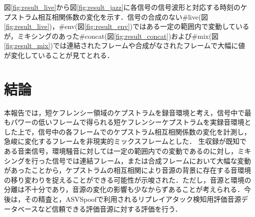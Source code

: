 \documentclass[technicalreport]{ieicej}
\begin{document}
図\ref{fig:result_live}から図\ref{fig:result_jazz}に各信号の信号波形と対応する時刻のケプストラム相互相関係数の変化を示す．信号の合成のない\#live(図\ref{fig:result_live})，\#env(図\ref{fig:result_env})ではある一定の範囲内で変動しているが，ミキシングのあった\#concat(図\ref{fig:result_concat})および\#mix(図\ref{fig:result_mix})では連結されたフレームや合成がなされたフレームで大幅に値が変化していることが見てとれる．




\section{結論}
本報告では，短ケフレンシー領域のケプストラムを録音環境と考え，信号中で最もパワーの低いフレームで得られる短ケフレンシーケプストラムを実録音環境とした上で，信号中の各フレームでのケプストラム相互相関係数の変化を計測し，急峻に変化するフレームを非現実的ミックスフレームとした．
生収録が既知である音楽信号，環境騒音に対しては一定の範囲内での変動であるのに対し，ミキシングを行った信号では連結フレーム，または合成フレームにおいて大幅な変動があったことから，ケプストラムの相互相関により音源の背景に存在する音環境の移り変わりを捉えることができる可能性が示唆された．ただし，音源と環境の分離は不十分であり，音源の変化の影響も少なからずあることが考えられる．今後は，その精査と，ASVSpoofで利用されるリプレイアタック検知用評価音源データベースなど信頼できる評価音源に対する評価を行う．



\end{document}
